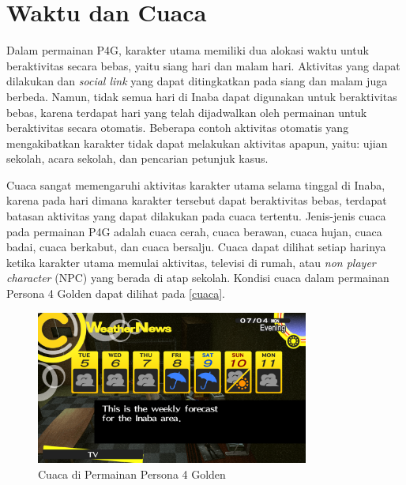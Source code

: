 

\section{Waktu dan Cuaca}
Dalam permainan P4G, karakter utama memiliki dua alokasi waktu untuk beraktivitas secara bebas, yaitu siang hari dan malam hari. Aktivitas yang dapat dilakukan dan \textit{social link} yang dapat ditingkatkan pada siang dan malam juga berbeda.
Namun, tidak semua hari di Inaba dapat digunakan untuk beraktivitas bebas, karena terdapat hari yang telah dijadwalkan oleh permainan untuk beraktivitas secara otomatis.
Beberapa contoh aktivitas otomatis yang mengakibatkan karakter tidak dapat melakukan aktivitas apapun, yaitu: ujian sekolah, acara sekolah, dan pencarian petunjuk kasus.

Cuaca sangat memengaruhi aktivitas karakter utama selama tinggal di Inaba, karena pada hari dimana karakter tersebut dapat beraktivitas bebas, terdapat batasan aktivitas yang dapat dilakukan pada cuaca tertentu. Jenis-jenis cuaca pada permainan P4G adalah cuaca cerah, cuaca berawan, cuaca hujan, cuaca badai, cuaca berkabut, dan cuaca bersalju. Cuaca dapat dilihat setiap harinya ketika karakter utama memulai aktivitas, televisi di rumah, atau \textit{non player character} (NPC) yang berada di atap sekolah. Kondisi cuaca dalam permainan Persona 4 Golden dapat dilihat pada \autoref{cuaca}.

\begin{figure}[htbp]
    \centering
    \includegraphics[width=0.8\textwidth]{resources/Dokumentasi/Screenshot (461).png}
    \caption{\label{cuaca}Cuaca di Permainan Persona 4 Golden}
\end{figure}

